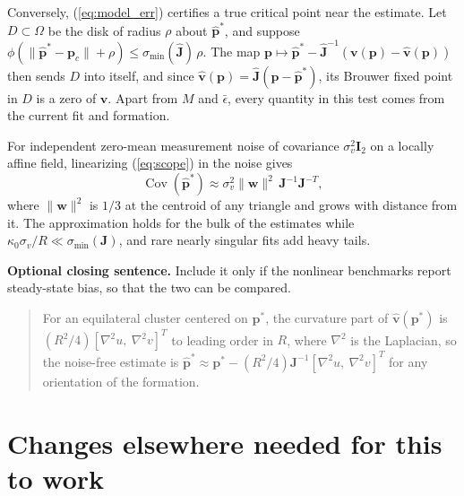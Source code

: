 \documentclass[10pt]{article}
\begin{document}
Conversely, (\ref{eq:model_err}) certifies a true critical point near the estimate. Let $D \subset \Omega$ be the disk of radius $\rho$ about $\hat{\mathbf{p}}^*$, and suppose $\phi(\|\hat{\mathbf{p}}^* - \mathbf{p}_c\| + \rho) \le \sigma_{\min}(\hat{\mathbf{J}})\,\rho$. The map $\mathbf{p} \mapsto \hat{\mathbf{p}}^* - \hat{\mathbf{J}}^{-1}(\mathbf{v}(\mathbf{p}) - \hat{\mathbf{v}}(\mathbf{p}))$ then sends $D$ into itself, and since $\hat{\mathbf{v}}(\mathbf{p}) = \hat{\mathbf{J}}(\mathbf{p} - \hat{\mathbf{p}}^*)$, its Brouwer fixed point in $D$ is a zero of $\mathbf{v}$. Apart from $M$ and $\bar{\epsilon}$, every quantity in this test comes from the current fit and formation.

For independent zero-mean measurement noise of covariance $\sigma_v^2\mathbf{I}_2$ on a locally affine field, linearizing (\ref{eq:scope}) in the noise gives
\begin{equation}\label{eq:cov}
\operatorname{Cov}(\hat{\mathbf{p}}^*) \approx \sigma_v^2\|\mathbf{w}\|^2\,\mathbf{J}^{-1}\mathbf{J}^{-T},
\end{equation}
where $\|\mathbf{w}\|^2$ is $1/3$ at the centroid of any triangle and grows with distance from it. The approximation holds for the bulk of the estimates while $\kappa_0\sigma_v/R \ll \sigma_{\min}(\mathbf{J})$, and rare nearly singular fits add heavy tails.

\smallskip
\noindent\textbf{Optional closing sentence.} Include it only if the nonlinear benchmarks report steady-state bias, so that the two can be compared.

\begin{quote}
For an equilateral cluster centered on $\mathbf{p}^*$, the curvature part of $\hat{\mathbf{v}}(\mathbf{p}^*)$ is $(R^2/4)[\nabla^2 u,\ \nabla^2 v]^T$ to leading order in $R$, where $\nabla^2$ is the Laplacian, so the noise-free estimate is $\hat{\mathbf{p}}^* \approx \mathbf{p}^* - (R^2/4)\mathbf{J}^{-1}[\nabla^2 u,\ \nabla^2 v]^T$ for any orientation of the formation.
\end{quote}

\section*{Changes elsewhere needed for this to work}
\end{document}
